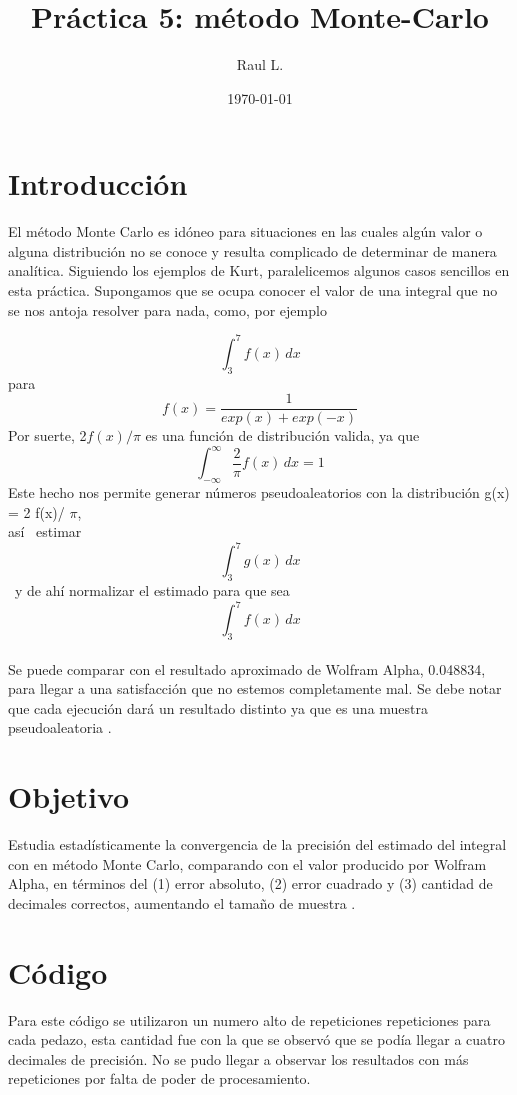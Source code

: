 \documentclass{article}
\author{Raul L.} %
\title{Pr\'{a}ctica 5: método Monte-Carlo} %
\date{\today}
\begin{document}

\maketitle %


\section{Introducci\'{o}n}\label{intro} %



El método Monte Carlo es idóneo para situaciones en las cuales algún valor o alguna distribución no se conoce y resulta complicado de determinar de manera analítica. Siguiendo los ejemplos de Kurt, paralelicemos algunos casos sencillos en esta práctica.
Supongamos que se ocupa conocer el valor de una integral que no se nos antoja resolver para nada, como, por ejemplo

\[ \int_{3}^{7} f(x) \,dx \] para
\[f(x) = \frac {1}{exp(x) + exp(-x)}\]
Por suerte, 2$f(x)/ \pi$ es una función de distribución valida, ya que
\[ \int_{-\infty}^{\infty}\frac{2}{\pi} f(x) \,dx = 1\]
Este hecho nos permite generar números pseudoaleatorios con la distribución 	g(x) = 2 f(x)/ $\pi$, \\ así \ estimar \[ \int_{3}^{7} g(x) \,dx \]
\ y de ahí normalizar el estimado para que sea \[\int_{3}^{7} f(x) \,dx\] \\
Se puede comparar con el resultado aproximado de Wolfram Alpha, 0.048834, para llegar a una satisfacción que no estemos completamente mal. Se debe notar que cada ejecución dará un resultado distinto ya que es una muestra pseudoaleatoria \citep{ejemplo}.

\section{Objetivo}
Estudia estadísticamente la convergencia de la precisión del estimado del integral con en método Monte Carlo, comparando con el valor producido por Wolfram Alpha, en términos del (1) error absoluto, (2) error cuadrado y (3) cantidad de decimales correctos, aumentando el tamaño de muestra \citep{ejemplo2}.

\newpage



\section{C\'{o}digo}
Para este código se utilizaron un numero alto de repeticiones  repeticiones para cada pedazo, esta cantidad fue con la que se observó que se podía llegar a cuatro decimales de precisión. No se pudo llegar a observar los resultados con más repeticiones por falta de poder de procesamiento.
\end{document}
